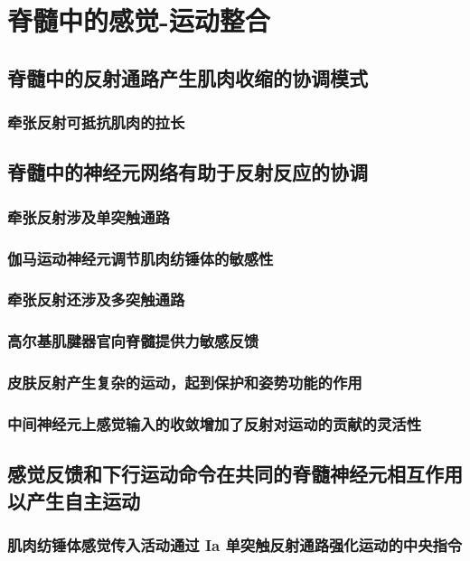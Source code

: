\chapter{脊髓中的感觉-运动整合}

\section{脊髓中的反射通路产生肌肉收缩的协调模式}
\subsection{牵张反射可抵抗肌肉的拉长}

\section{脊髓中的神经元网络有助于反射反应的协调}
\subsection{牵张反射涉及单突触通路}
\subsection{伽马运动神经元调节肌肉纺锤体的敏感性}
\subsection{牵张反射还涉及多突触通路}
\subsection{高尔基肌腱器官向脊髓提供力敏感反馈}
\subsection{皮肤反射产生复杂的运动，起到保护和姿势功能的作用}
\subsection{中间神经元上感觉输入的收敛增加了反射对运动的贡献的灵活性}

\section{感觉反馈和下行运动命令在共同的脊髓神经元相互作用以产生自主运动}
\subsection{肌肉纺锤体感觉传入活动通过 Ia 单突触反射通路强化运动的中央指令}
